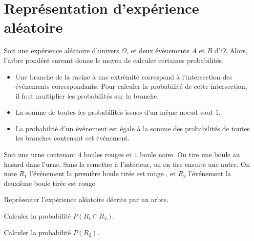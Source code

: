 \documentclass{poly}
\begin{document}
\section{Représentation d'expérience aléatoire}
\begin{example}
Soit une expérience aléatoire d'univers $\Omega$, et deux événements $A$ et $B$ d'$\Omega$. Alors, l'arbre pondéré suivant donne le moyen de calculer certaines probabilités.
\begin{center}
\end{center}
\end{example}
\begin{proposition}
\hfill
\begin{itemize}
\item Une branche de la racine à une extrémité correspond à l'intersection des événements correspondants. Pour calculer la probabilité de cette intersection, il faut multiplier les probabilités sur la branche.
\item La somme de toutes les probabilités issues d'un même noeud vaut $1$.
\item La probabilité d'un événement est égale à la somme des probabilités de toutes les branches contenant cet événement. 
\end{itemize}        
\end{proposition}
\begin{exercize}
Soit une urne contenant $4$ boules rouges et $1$ boule noire. On tire une boule au hasard dans l'urne. Sans la remettre à l'intérieur, on en tire ensuite une autre. On note $R_1$ l'événement \og la première boule tirée est rouge \fg, et $R_2$ l'événement \og la deuxième boule tirée est rouge \fg
\begin{alphaquestions}
\item Représenter l'expérience aléatoire décrite par un arbre.
\item Calculer la probabilité $P(R_1 \cap R_2)$.
\item Calculer la probabilité $P(R_2)$.
\end{alphaquestions}
\end{exercize}
\newpage
\end{document}
